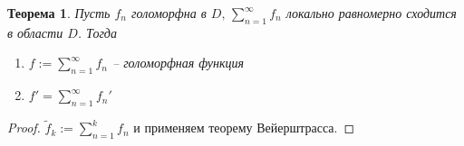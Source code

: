 \documentclass[a4paper,12pt]{article}
\theoremstyle{plain}
\newtheorem{theorem}{Теорема}[section]
\theoremstyle{definition}
\theoremstyle{remark}
\begin{document}
\begin{theorem}
	Пусть $f_n$ голоморфна в $D,\, \sum_{n = 1}^\infty f_n$ локально равномерно сходится в области $D$. Тогда
	\begin{enumerate}
		\item $f := \sum_{n = 1}^\infty f_n$ -- голоморфная функция
		\item $f' = \sum_{n = 1}^\infty f_n'$
	\end{enumerate}
\end{theorem}

\begin{proof}
	$\tilde{f}_k := \sum_{n = 1}^k f_n$ и применяем теорему Вейерштрасса.
\end{proof}
\end{document}

